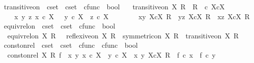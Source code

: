 \begin{isabellebody}
\isanewline
{}\isamarkupfalse%
\ transitive{\isacharunderscore}{\kern0pt}on\ {\isacharcolon}{\kern0pt}{\isacharcolon}{\kern0pt}\ {\isachardoublequoteopen}cset\ {\isasymRightarrow}\ cset\ {\isasymtimes}\ cfunc\ {\isasymRightarrow}\ bool{\isachardoublequoteclose}\ \isanewline
\ \ {\isachardoublequoteopen}transitive{\isacharunderscore}{\kern0pt}on\ X\ R\ {\isacharequal}{\kern0pt}\ {\isacharparenleft}{\kern0pt}R\ \ {\isasymsubseteq}\isactrlsub c\ X{\isasymtimes}\isactrlsub cX\ {\isasymand}\isanewline
\ \ \ \ {\isacharparenleft}{\kern0pt}{\isasymforall}x\ y\ z{\isachardot}{\kern0pt}\ x\ {\isasymin}\isactrlsub c\ X\ {\isasymand}\ \ y\ {\isasymin}\isactrlsub c\ X\ {\isasymand}\ z\ {\isasymin}\isactrlsub c\ X\ \ {\isasymlongrightarrow}\isanewline
\ \ \ \ \ \ {\isacharparenleft}{\kern0pt}{\isasymlangle}x{\isacharcomma}{\kern0pt}y{\isasymrangle}\ {\isasymin}\isactrlbsub X{\isasymtimes}\isactrlsub cX\isactrlesub \ R\ {\isasymand}\ {\isasymlangle}y{\isacharcomma}{\kern0pt}z{\isasymrangle}\ {\isasymin}\isactrlbsub X{\isasymtimes}\isactrlsub cX\isactrlesub \ R\ {\isasymlongrightarrow}\ {\isasymlangle}x{\isacharcomma}{\kern0pt}z{\isasymrangle}\ {\isasymin}\isactrlbsub X{\isasymtimes}\isactrlsub cX\isactrlesub \ R{\isacharparenright}{\kern0pt}{\isacharparenright}{\kern0pt}{\isacharparenright}{\kern0pt}{\isachardoublequoteclose}\isanewline
\isanewline
{}\isamarkupfalse%
\ equiv{\isacharunderscore}{\kern0pt}rel{\isacharunderscore}{\kern0pt}on\ {\isacharcolon}{\kern0pt}{\isacharcolon}{\kern0pt}\ {\isachardoublequoteopen}cset\ {\isasymRightarrow}\ cset\ {\isasymtimes}\ cfunc\ {\isasymRightarrow}\ bool{\isachardoublequoteclose}\ \isanewline
\ \ {\isachardoublequoteopen}equiv{\isacharunderscore}{\kern0pt}rel{\isacharunderscore}{\kern0pt}on\ X\ R\ \ {\isasymlongleftrightarrow}\ {\isacharparenleft}{\kern0pt}reflexive{\isacharunderscore}{\kern0pt}on\ X\ R\ {\isasymand}\ symmetric{\isacharunderscore}{\kern0pt}on\ X\ R\ {\isasymand}\ transitive{\isacharunderscore}{\kern0pt}on\ X\ R{\isacharparenright}{\kern0pt}{\isachardoublequoteclose}\isanewline
\isanewline
{}\isamarkupfalse%
\ const{\isacharunderscore}{\kern0pt}on{\isacharunderscore}{\kern0pt}rel\ {\isacharcolon}{\kern0pt}{\isacharcolon}{\kern0pt}\ {\isachardoublequoteopen}cset\ {\isasymRightarrow}\ cset\ {\isasymtimes}\ cfunc\ {\isasymRightarrow}\ cfunc\ {\isasymRightarrow}\ bool{\isachardoublequoteclose}\ \isanewline
\ \ {\isachardoublequoteopen}const{\isacharunderscore}{\kern0pt}on{\isacharunderscore}{\kern0pt}rel\ X\ R\ f\ {\isacharequal}{\kern0pt}\ {\isacharparenleft}{\kern0pt}{\isasymforall}x\ y{\isachardot}{\kern0pt}\ x\ {\isasymin}\isactrlsub c\ X\ {\isasymlongrightarrow}\ y\ {\isasymin}\isactrlsub c\ X\ {\isasymlongrightarrow}\ {\isasymlangle}x{\isacharcomma}{\kern0pt}\ y{\isasymrangle}\ {\isasymin}\isactrlbsub X{\isasymtimes}\isactrlsub cX\isactrlesub \ R\ {\isasymlongrightarrow}\ f\ {\isasymcirc}\isactrlsub c\ x\ {\isacharequal}{\kern0pt}\ f\ {\isasymcirc}\isactrlsub c\ y{\isacharparenright}{\kern0pt}{\isachardoublequoteclose}\isanewline

\end{isabellebody}
